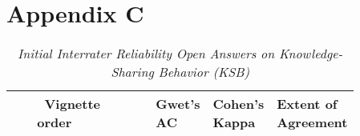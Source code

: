 \documentclass[twocolumn, serif, empirical, authordate]{jote-article}
\begin{document}
\pagebreak
{}
\section*{Appendix C}


\begin{table}[h!]\sffamily
\caption{\emph{Initial Interrater Reliability Open Answers on Knowledge-Sharing Behavior (KSB)}
}
\label{tab:table5}
\begin{tabular}{>{\raggedright\arraybackslash}p{0.08\linewidth} >{\raggedright\arraybackslash}p{0.210\linewidth} >{\raggedright\arraybackslash}p{0.1885\linewidth} >{\raggedright\arraybackslash}p{0.1263\linewidth} >{\raggedright\arraybackslash}p{0.1263\linewidth} >{\raggedright\arraybackslash}p{0.1262\linewidth}}

        &  \textbf{Vignette order} &   & \textbf{Gwet's AC} & \textbf{Cohen's Kappa} & \textbf{Extent of Agreement}\\ \toprule


\end{tabular}
\end{table}
\end{document}
